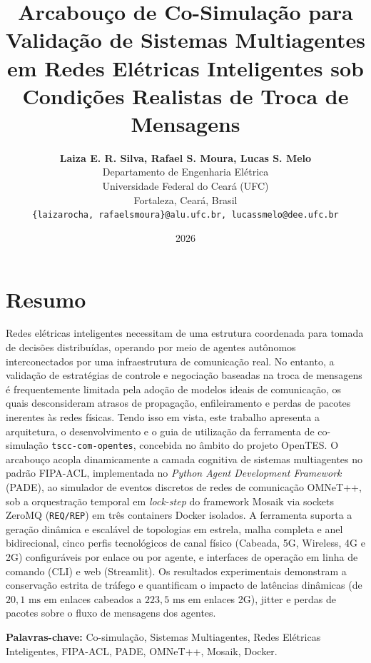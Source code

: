 \documentclass[10pt,twocolumn,a4paper]{article}
\title{\textbf{Arcabouço de Co-Simulação para Validação de Sistemas Multiagentes em Redes Elétricas Inteligentes sob Condições Realistas de Troca de Mensagens}}
\author{
    \textbf{Laiza E. R. Silva, Rafael S. Moura, Lucas S. Melo}\\
    \small Departamento de Engenharia Elétrica\\
    \small Universidade Federal do Ceará (UFC)\\
    \small Fortaleza, Ceará, Brasil\\
    \small \texttt{\{laizarocha, rafaelsmoura\}@alu.ufc.br, lucassmelo@dee.ufc.br}
}
\date{2026}
\begin{document}
\maketitle

\section*{Resumo}

Redes elétricas inteligentes necessitam de uma estrutura coordenada para tomada de decisões distribuídas, operando por meio de agentes autônomos interconectados por uma infraestrutura de comunicação real. No entanto, a validação de estratégias de controle e negociação baseadas na troca de mensagens é frequentemente limitada pela adoção de modelos ideais de comunicação, os quais desconsideram atrasos de propagação, enfileiramento e perdas de pacotes inerentes às redes físicas. Tendo isso em vista, este trabalho apresenta a arquitetura, o desenvolvimento e o guia de utilização da ferramenta de co-simulação \texttt{tscc-com-opentes}, concebida no âmbito do projeto OpenTES. O arcabouço acopla dinamicamente a camada cognitiva de sistemas multiagentes no padrão FIPA-ACL, implementada no \textit{Python Agent Development Framework} (PADE), ao simulador de eventos discretos de redes de comunicação OMNeT++, sob a orquestração temporal em \textit{lock-step} do framework Mosaik via sockets ZeroMQ (\texttt{REQ/REP}) em três containers Docker isolados. A ferramenta suporta a geração dinâmica e escalável de topologias em estrela, malha completa e anel bidirecional, cinco perfis tecnológicos de canal físico (Cabeada, 5G, Wireless, 4G e 2G) configuráveis por enlace ou por agente, e interfaces de operação em linha de comando (CLI) e web (Streamlit). Os resultados experimentais demonstram a conservação estrita de tráfego e quantificam o impacto de latências dinâmicas (de $20{,}1\text{ ms}$ em enlaces cabeados a $223{,}5\text{ ms}$ em enlaces 2G), jitter e perdas de pacotes sobre o fluxo de mensagens dos agentes.

\vspace{0.4em}
\noindent\textbf{Palavras-chave:} Co-simulação, Sistemas Multiagentes, Redes Elétricas Inteligentes, FIPA-ACL, PADE, OMNeT++, Mosaik, Docker.

\end{document}
